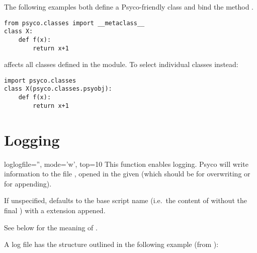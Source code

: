 \documentclass{manual}
\begin{document}
The following examples both define a Psyco-friendly class  and bind the method .

\begin{verbatim}
from psyco.classes import __metaclass__
class X:
    def f(x):
        return x+1
\end{verbatim}

 affects all classes defined in the module.  To select individual classes instead:

\begin{verbatim}
import psyco.classes
class X(psyco.classes.psyobj):
    def f(x):
        return x+1
\end{verbatim}


\section{Logging}

\begin{funcdesc}{log}{logfile='', mode='w', top=10}
This function enables logging. Psyco will write information to the file , opened in the given  (which should be  for overwriting or  for appending).

If unspecified,  defaults to the base script name (i.e.\ the content of  without the final ) with a  extension appened.

See below for the meaning of .
\end{funcdesc}

A log file has the structure outlined in the following example (from ):
\end{document}
